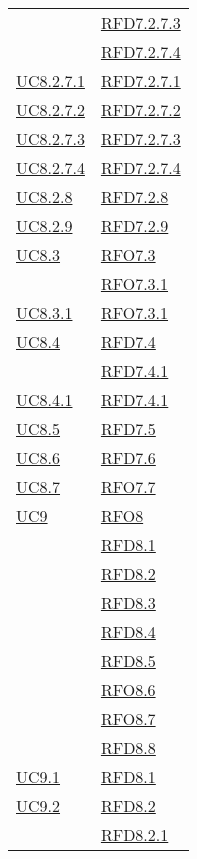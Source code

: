 \begin{longtable}{|>{\centering}m{5cm}|m{5cm}<{\centering}|}
& \hyperlink{RFD7.2.7.3}{RFD7.2.7.3}\\
& \hyperlink{RFD7.2.7.4}{RFD7.2.7.4}\\ \hline
\hyperref[UC8.2.7.1]{UC8.2.7.1} & \hyperlink{RFD7.2.7.1}{RFD7.2.7.1}\\ \hline
\hyperref[UC8.2.7.2]{UC8.2.7.2} & \hyperlink{RFD7.2.7.2}{RFD7.2.7.2}\\ \hline
\hyperref[UC8.2.7.3]{UC8.2.7.3} & \hyperlink{RFD7.2.7.3}{RFD7.2.7.3}\\ \hline
\hyperref[UC8.2.7.4]{UC8.2.7.4} & \hyperlink{RFD7.2.7.4}{RFD7.2.7.4}\\ \hline
\hyperref[UC8.2.8]{UC8.2.8} & \hyperlink{RFD7.2.8}{RFD7.2.8}\\ \hline
\hyperref[UC8.2.9]{UC8.2.9} & \hyperlink{RFD7.2.9}{RFD7.2.9}\\ \hline
\hyperref[UC8.3]{UC8.3} & \hyperlink{RFO7.3}{RFO7.3}\\
& \hyperlink{RFO7.3.1}{RFO7.3.1}\\ \hline
\hyperref[UC8.3.1]{UC8.3.1} & \hyperlink{RFO7.3.1}{RFO7.3.1}\\ \hline
\hyperref[UC8.4]{UC8.4} & \hyperlink{RFD7.4}{RFD7.4}\\
& \hyperlink{RFD7.4.1}{RFD7.4.1}\\ \hline
\hyperref[UC8.4.1]{UC8.4.1} & \hyperlink{RFD7.4.1}{RFD7.4.1}\\ \hline
\hyperref[UC8.5]{UC8.5} & \hyperlink{RFD7.5}{RFD7.5}\\ \hline
\hyperref[UC8.6]{UC8.6} & \hyperlink{RFD7.6}{RFD7.6}\\ \hline
\hyperref[UC8.7]{UC8.7} & \hyperlink{RFO7.7}{RFO7.7}\\ \hline
\hyperref[UC9]{UC9} & \hyperlink{RFO8}{RFO8}\\
& \hyperlink{RFD8.1}{RFD8.1}\\
& \hyperlink{RFD8.2}{RFD8.2}\\
& \hyperlink{RFD8.3}{RFD8.3}\\
& \hyperlink{RFD8.4}{RFD8.4}\\
& \hyperlink{RFD8.5}{RFD8.5}\\
& \hyperlink{RFO8.6}{RFO8.6}\\
& \hyperlink{RFO8.7}{RFO8.7}\\
& \hyperlink{RFD8.8}{RFD8.8}\\ \hline
\hyperref[UC9.1]{UC9.1} & \hyperlink{RFD8.1}{RFD8.1}\\ \hline
\hyperref[UC9.2]{UC9.2} & \hyperlink{RFD8.2}{RFD8.2}\\
& \hyperlink{RFD8.2.1}{RFD8.2.1}\\

\end{longtable}
